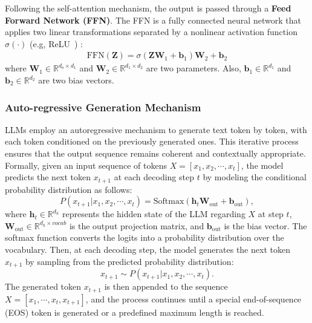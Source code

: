 Following the self-attention mechanism, 
the output is passed through a \textbf{Feed Forward Network (FFN)}. The FFN is a fully connected neural network that applies two linear transformations separated by a nonlinear activation function $\sigma(\cdot)$ (e.g, ReLU~\cite{agarap2018deep}) :
\begin{align}\label{eq:ffn}
    \text{FFN}(\mathbf{Z}) = \sigma(\mathbf{Z}\mathbf{W}_1 + \mathbf{b}_1)\mathbf{W}_2 + \mathbf{b}_2
\end{align}
where $\mathbf{W}_1 \in \mathbb{R}^{d_o \times d_1}$ and $\mathbf{W}_2 \in \mathbb{R}^{d_1 \times d_2}$ are  two  parameters.
Also, $\mathbf{b}_1 \in \mathbb{R}^{d_1}$ and $\mathbf{b}_2 \in \mathbb{R}^{d_2}$ are two bias vectors.

\subsubsection{Auto-regressive Generation Mechanism}\label{ssec:auto_regressive}
LLMs employ an autoregressive mechanism to generate text token by token, with each token conditioned on the previously generated ones. This iterative process ensures that the output sequence remains coherent and contextually appropriate.
Formally, given an input sequence of tokens $X = [x_1, x_2, \cdots, x_t]$, 
the model predicts the next token $x_{t+1}$ at each decoding step $t$ by modeling the conditional probability distribution as follows:
\begin{equation}
P(x_{t+1} | x_1, x_2, \cdots, x_t) = \text{Softmax}(\mathbf{h}_t \mathbf{W}_{\text{out}} + \mathbf{b}_{\text{out}}),
\end{equation}
where $\mathbf{h}_t \in \mathbb{R}^{d_h}$ represents the hidden state of the LLM regarding $X$ at step $t$, $\mathbf{W}_{\text{out}} \in \mathbb{R}^{d_h \times vocab}$ is the output projection matrix, and $\mathbf{b}_{\text{out}}$ is the bias vector. 
The softmax function converts the logits into a probability distribution over the vocabulary.
Then,
at each decoding step, the model generates the next token $x_{t+1}$ by sampling from the predicted probability distribution:
\begin{equation}
x_{t+1} \sim P(x_{t+1} | x_1, x_2, \cdots, x_t).
\end{equation}
The generated token $x_{t+1}$ is then appended to the sequence $X=[x_1,\cdots,x_t,x_{t+1}]$, and the process continues until a special end-of-sequence (EOS) token is generated or a predefined maximum length is reached.



